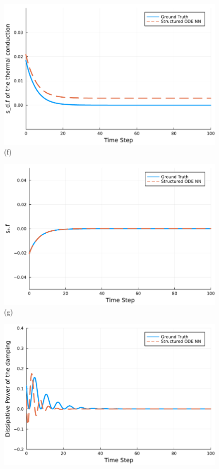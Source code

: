 \documentclass[
	parskip, 			   %
	twoside, 			   %
	DIV=14, 			   %
	BCOR=15.0mm, 		   %
	headsepline, 		   %
	open=right, 		   %
	captions=tableheading, %
	bibliography=totoc,    %
	numbers=noenddot       %
]{scrreprt}
\begin{document}
\begin{figure}[h!]
\begin{minipage}{.3\textwidth}
    \includegraphics[width=1\linewidth]{figures/sd_tc.f_compositional_ndho.pdf}
    \\(f)
    \end{minipage}
    \begin{minipage}{.3\textwidth}
    \centering
    \includegraphics[width=1\linewidth]{figures/se.f_compositional_ndho.pdf}
    \\(g)
    \end{minipage}%
    \begin{minipage}{.3\textwidth}
    \centering
    \includegraphics[width=1\linewidth]{figures/dissipative_power_damping_ndho.pdf}

\end{minipage}
\end{figure}
\end{document}
